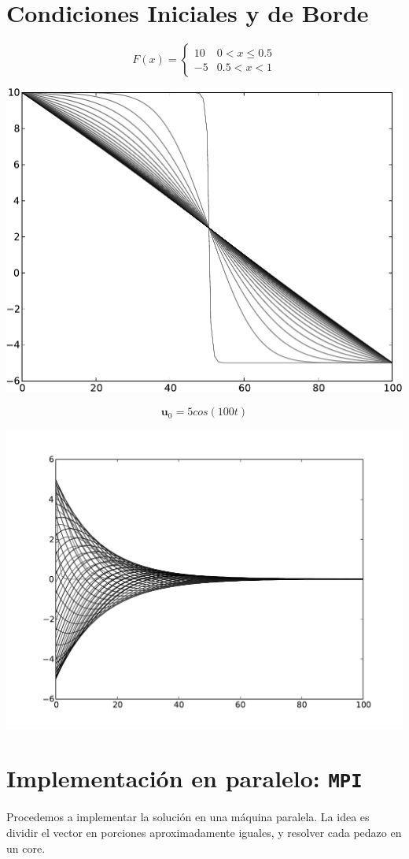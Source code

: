 \documentclass[12pt, a4paper]{article}
\begin{document}
		\section{Condiciones Iniciales y de Borde}
			$$F(x)=\begin{cases}10 & 0<x\leq 0.5\\ -5 & 0.5<x<1\end{cases}$$
			\begin{center}\includegraphics[width=.8\textwidth]{3a.pdf}\end{center}
			
			$$\mathbf{u}_0 = 5cos(100t)$$
			\begin{center}\includegraphics[width=.8\textwidth]{3b.pdf}\end{center}
		
		\section{Implementación en paralelo: \texttt{MPI}}
			Procedemos a implementar la solución en una máquina paralela.
			La idea es dividir el vector en porciones aproximadamente iguales, y resolver cada pedazo en un core.
			
\end{document}
